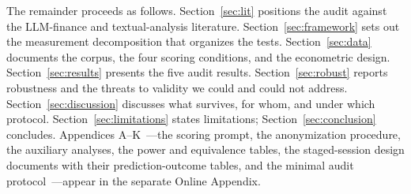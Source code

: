 The remainder proceeds as follows. Section~\ref{sec:lit} positions the audit against the LLM-finance and textual-analysis literature. Section~\ref{sec:framework} sets out the measurement decomposition that organizes the tests. Section~\ref{sec:data} documents the corpus, the four scoring conditions, and the econometric design. Section~\ref{sec:results} presents the five audit results. Section~\ref{sec:robust} reports robustness and the threats to validity we could and could not address. Section~\ref{sec:discussion} discusses what survives, for whom, and under which protocol. Section~\ref{sec:limitations} states limitations; Section~\ref{sec:conclusion} concludes. Appendices A--K~---the scoring prompt, the anonymization procedure, the auxiliary analyses, the power and equivalence tables, the staged-session design documents with their prediction-outcome tables, and the minimal audit protocol~---appear in the separate Online Appendix.
